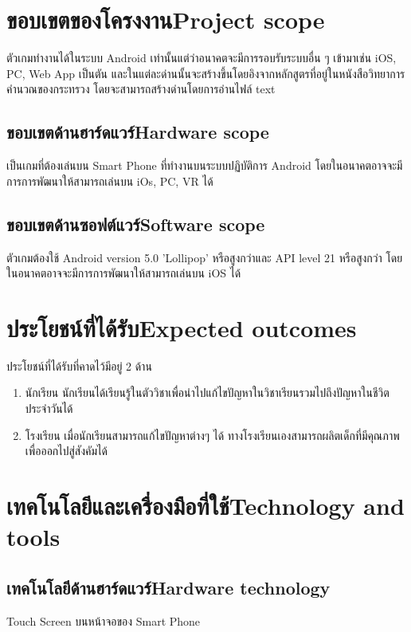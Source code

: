 \section{\ifcpe ขอบเขตของโครงงาน\else Project scope\fi}
ตัวเกมทำงานได้ในระบบ Android เท่านั้นแต่ว่าอนาคตจะมีการรอบรับระบบอื่น ๆ 
เข้ามาเช่น iOS, PC, Web App เป็นตัน 
และในแต่ละด่านนั้นจะสร้างขึ้นโดยอิงจากหลักสูตรที่อยู่ในหนังสือวิทยาการคำนวณของกระทรวง
โดยจะสามารถสร้างด่านโดยการอ่านไฟล์ text

\subsection{\ifcpe ขอบเขตด้านฮาร์ดแวร์\else Hardware scope\fi}
เป็นเกมที่ต้องเล่นบน Smart Phone ที่ทำงานบนระบบปฏิบัติการ Android โดยในอนาคตอาจจะมีการการพัฒนาให้สามารถเล่นบน iOs, PC, VR ได้

\subsection{\ifcpe ขอบเขตด้านซอฟต์แวร์\else Software scope\fi}
ตัวเกมต้องใช้ Android version 5.0 'Lollipop' หรือสูงกว่าและ API level 21 หรือสูงกว่า
โดยในอนาคตอาจจะมีการการพัฒนาให้สามารถเล่นบน iOS ได้

\section{\ifcpe ประโยชน์ที่ได้รับ\else Expected outcomes\fi}
ประโยชน์ที่ได้รับที่คาดไว้มีอยู่ 2 ด้าน 
\begin{enumerate}
    \item นักเรียน นักเรียนได้เรียนรู้ในตัววิชาเพื่อนำไปแก้ไขปัญหาในวิชาเรียนรวมไปถึงปัญหาในชีวิตประจำวันได้
    \item โรงเรียน เมื่อนักเรียนสามารถแก้ไขปัญหาต่างๆ ได้ ทางโรงเรียนเองสามารถผลิตเด็กที่มีคุณภาพเพื่อออกไปสู่สังคัมได้ 
\end{enumerate}

\section{\ifcpe เทคโนโลยีและเครื่องมือที่ใช้\else Technology and tools\fi}

\subsection{\ifcpe เทคโนโลยีด้านฮาร์ดแวร์\else Hardware technology\fi}
Touch Screen บนหน้าจอของ Smart Phone

